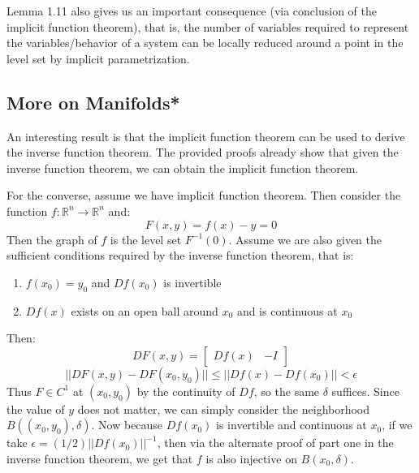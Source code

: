 \documentclass[10pt,letterpaper]{article} %
\begin{document}
Lemma 1.11 also gives us an important consequence (via conclusion of the implicit function theorem), that is, the number of variables required to represent the variables/behavior of a system can be locally reduced around a point in the level set by implicit parametrization.

\subsection{More on Manifolds*}
An interesting result is that the implicit function theorem can be used to derive the inverse function theorem. The provided proofs already show that given the inverse function theorem, we can obtain the implicit function theorem.

For the converse, assume we have implicit function theorem. Then consider the function $f: \mathbb{R}^n \xrightarrow{} \mathbb{R}^n$ and:
\begin{equation*}
F(x, y) = f(x) - y = 0
\end{equation*}
Then the graph of $f$ is the level set $F^{-1}(0)$. Assume we are also given the sufficient conditions required by the inverse function theorem, that is:
\begin{enumerate}
\item $f(x_0) = y_0$ and $Df(x_0)$ is invertible
\item $Df(x)$ exists on an open ball around $x_0$ and is continuous at $x_0$
\end{enumerate}
Then:
\begin{equation*}
DF(x, y) = \begin{bmatrix}
Df(x) & -I
\end{bmatrix}
\end{equation*}
\begin{equation*}
||DF(x, y) - DF(x_0, y_0)|| \leqslant ||Df(x) - Df(x_0)|| < \epsilon
\end{equation*}
Thus $F \in C^1$ at $(x_0, y_0)$ by the continuity of $Df$, so the same $\delta$ suffices. Since the value of $y$ does not matter, we can simply consider the neighborhood $B((x_0, y_0), \delta)$. Now because $Df(x_0)$ is invertible and continuous at $x_0$, if we take $\epsilon = (1/2)||Df(x_0)||^{-1}$, then via the alternate proof of part one in the inverse function theorem, we get that $f$ is also injective on $B(x_0, \delta)$.\\
\end{document}

